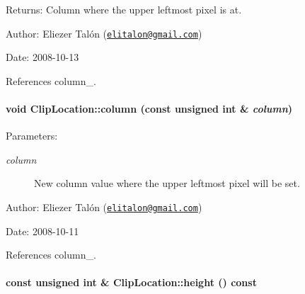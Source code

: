 \begin{Desc}
\item[Returns:]Column where the upper leftmost pixel is at.\end{Desc}
\begin{Desc}
\item[Author:]Eliezer Talón (\href{mailto:elitalon@gmail.com}{\tt elitalon@gmail.com}) \end{Desc}
\begin{Desc}
\item[Date:]2008-10-13 \end{Desc}


References column\_\-.\hypertarget{class_clip_location_321238ca06a98bcce5f5292c1ea3e6c0}{
\paragraph[column]{\setlength{\rightskip}{0pt plus 5cm}void ClipLocation::column (const unsigned int \& {\em column})}\hfill}
\label{class_clip_location_321238ca06a98bcce5f5292c1ea3e6c0}


\begin{Desc}
\item[Parameters:]
\begin{description}
\item[{\em column}]New column value where the upper leftmost pixel will be set.\end{description}
\end{Desc}
\begin{Desc}
\item[Author:]Eliezer Talón (\href{mailto:elitalon@gmail.com}{\tt elitalon@gmail.com}) \end{Desc}
\begin{Desc}
\item[Date:]2008-10-11 \end{Desc}


References column\_\-.\hypertarget{class_clip_location_e18ec2c31e76a983acdbaec9d3bad659}{
\paragraph[height]{\setlength{\rightskip}{0pt plus 5cm}const unsigned int \& ClipLocation::height () const}\hfill}
\label{class_clip_location_e18ec2c31e76a983acdbaec9d3bad659}


